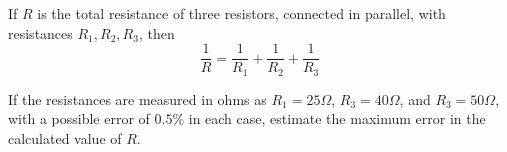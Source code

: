 \documentclass[12pt]{amsart}
\begin{document}
\begin{problem}
    If $R$ is the total resistance of three resistors, connected in parallel, with resistances $R_1, R_2, R_3$, then
$$
\frac{1}{R}=\frac{1}{R_1}+\frac{1}{R_2}+\frac{1}{R_3}
$$

If the resistances are measured in ohms as $R_1=25 \Omega$, $R_3=40 \Omega$, and $R_3=50 \Omega$, with a possible error of $0.5 \%$ in each case, estimate the maximum error in the calculated value of $R$.
\end{problem}
\end{document}
